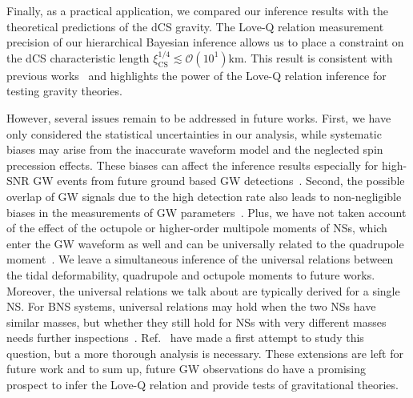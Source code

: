 \documentclass[a4paper,11pt]{article}
\begin{document}
Finally, as a practical application, we compared our inference results with the theoretical predictions of the dCS gravity. The Love-Q relation measurement precision of our hierarchical Bayesian inference allows us to place a constraint on the dCS characteristic length $\xi_{\mathrm{CS}}^{1/4} \lesssim \mathcal{O}(10^1)$km. This result is consistent with previous works~\cite{Yagi:2013bca,Yagi:2013awa} and highlights the power of the Love-Q relation inference for testing gravity theories.

However, several issues remain to be addressed in future works. First, we have only considered the statistical uncertainties in our analysis, while systematic biases may arise from the inaccurate waveform model and the neglected spin precession effects. These biases can affect the inference results especially for high-SNR GW events from future ground based GW detections~\cite{Williamson:2017evr,Purrer:2019jcp,Gamba:2020wgg}. Second, the possible overlap of GW signals due to the high detection rate also leads to non-negligible biases in the measurements of GW parameters~\cite{Pizzati:2021apa,Hu:2022bji,Wang:2023ldq}. Plus, we have not taken account of the effect of the octupole or higher-order multipole moments of NSs, which enter the GW waveform as well and can be universally related to the quadrupole moment~\cite{Yagi_2017,Abac:2023ujg}. We leave a simultaneous inference of the universal relations between the tidal deformability, quadrupole and octupole moments to future works. Moreover, the universal relations we talk about are typically derived for a single NS. For BNS systems, universal relations may hold when the two NSs have similar masses, but whether they still hold for NSs with very different masses needs further inspections~\cite{Shao:2022koz}. Ref.~\cite{Saffer:2021gak} have made a first attempt to study this question, but a more thorough analysis is necessary. These extensions are left for future work and to sum up, future GW observations do have a promising prospect to infer the Love-Q relation and provide tests of gravitational theories. 


\acknowledgments

\clearpage


% 

\end{document}
